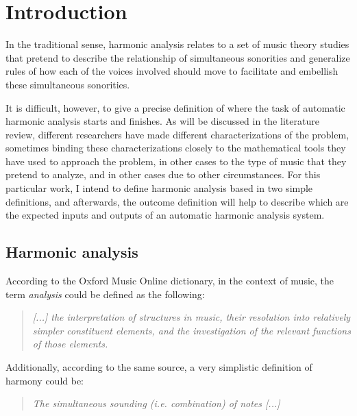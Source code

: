 \chapter{Introduction}
In the traditional sense, harmonic analysis relates to a set of music theory studies that pretend to describe the relationship of simultaneous sonorities and generalize rules of how each of the voices involved should move to facilitate and embellish these simultaneous sonorities.

It is difficult, however, to give a precise definition of where the task of automatic harmonic analysis starts and finishes. As will be discussed in the literature review, different researchers have made different characterizations of the problem, sometimes binding these characterizations closely to the mathematical tools they have used to approach the problem, in other cases to the type of music that they pretend to analyze, and in other cases due to other circumstances. For this particular work, I intend to define harmonic analysis based in two simple definitions, and afterwards, the outcome definition will help to describe which are the expected inputs and outputs of an automatic harmonic analysis system.

\section{Harmonic analysis}
According to the Oxford Music Online dictionary, in the context of music, the term \emph{analysis} could be defined as the following: \cite{oxfordanalysis}

\begin{quote}
\centering
\emph{[...] the interpretation of structures in music, \linebreak
their resolution into relatively simpler constituent elements, \linebreak and the investigation of the relevant functions of those elements.}
\end{quote}

Additionally, according to the same source, a very simplistic definition of harmony could be: \cite{oxfordharmony}

\begin{quote}
\centering
\emph{The simultaneous sounding (i.e. combination) of notes [...]}
\end{quote}

